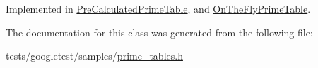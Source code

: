 Implemented in \hyperlink{classPreCalculatedPrimeTable_a62be946777f7f98bbfc01edc0f15a4bb}{Pre\+Calculated\+Prime\+Table}, and \hyperlink{classOnTheFlyPrimeTable_ac8236514299e4558a5220c3e06f7f61a}{On\+The\+Fly\+Prime\+Table}.



The documentation for this class was generated from the following file\+:\begin{DoxyCompactItemize}
\item 
tests/googletest/samples/\hyperlink{prime__tables_8h}{prime\+\_\+tables.\+h}\end{DoxyCompactItemize}
